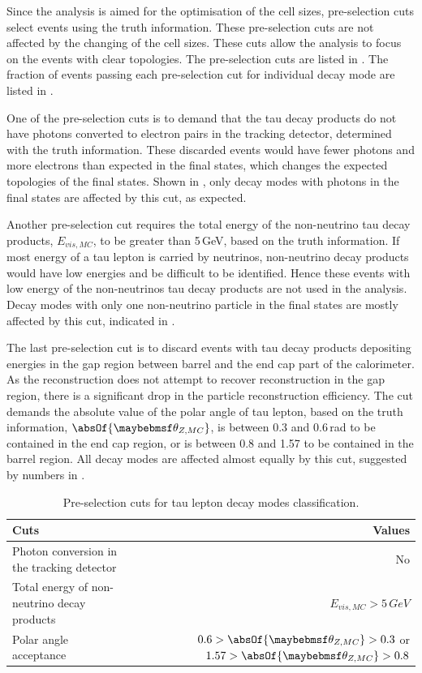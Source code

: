 Since the analysis is aimed for the optimisation of the \ECAL cell sizes, pre-selection cuts select events using the truth information. These pre-selection cuts are not affected by the changing of the \ECAL cell sizes. These cuts allow the analysis to focus on the events with clear topologies. The pre-selection cuts are listed in . The fraction of events passing each pre-selection cut for individual decay mode are listed in .

One of the pre-selection cuts is to demand that the tau decay products  do not have photons converted to electron pairs in the tracking detector, determined with the truth information. These discarded events would have fewer photons and more electrons than expected in the final states, which changes the expected topologies of the final states. Shown in , only decay modes with photons in the final states are affected by this cut, as expected.


Another pre-selection cut requires the total energy of the non-neutrino tau decay products, $E_{vis,MC}$, to be greater than 5\,GeV, based on the truth information. If most energy of a tau lepton is carried by  neutrinos, non-neutrino decay products would have low energies and be difficult to be identified. Hence these events with low energy of the non-neutrinos tau decay products are not used in the analysis. Decay modes with only one non-neutrino particle in the final states are mostly affected by this cut, indicated in .

The last pre-selection cut is to discard events with tau decay products depositing energies in the gap region between barrel and the end cap part of the calorimeter. As the reconstruction   does not attempt to recover reconstruction in the gap region, there is a significant drop in the particle reconstruction efficiency. The cut demands the absolute value of the polar angle of tau lepton, based on the truth information, $\absOf{\theta_{Z,MC}}$, is between 0.3 and 0.6\,rad to be contained in the end cap region, or is between 0.8 and 1.57 to be contained in the barrel region. All decay modes are affected almost equally by this cut, suggested by numbers in .


\begin{table}[htbp]\centering
\smallskip
\begin{tabular}{l r}
\hline
\hline
Cuts & Values\\
\hline
\multicolumn{1}{L{0.4\textwidth}}{Photon conversion in the tracking detector}& No \\
\multicolumn{1}{L{0.4\textwidth}}{Total energy of non-neutrino decay products} & $E_{vis,MC} > 5\,GeV$ \\
Polar angle acceptance & \multicolumn{1}{R{0.5\textwidth}}{$0.6 > \absOf{\theta_{Z,MC}} > 0.3$ or $1.57 > \absOf{\theta_{Z,MC}} > 0.8$} \\
\hline
\hline
\end{tabular}
\caption[Pre-selection cuts for tau lepton decay final state classification.]
{Pre-selection cuts for tau lepton decay modes classification.}
\label{tab:tauPreSel}
\end{table}



